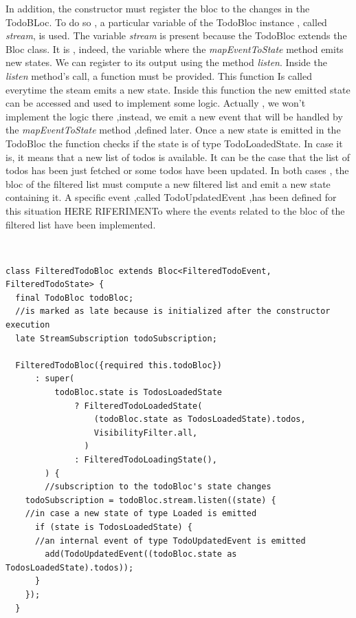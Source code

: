 In addition, the constructor must register the bloc to the changes in the TodoBLoc. To do so , a particular variable of the TodoBloc instance , called \textit{stream}, is used. The variable \textit{stream} is present because the TodoBloc extends the Bloc class. It is , indeed, the variable where the \textit{mapEventToState} method emits new states. We can register to its output using the method \textit{listen}. Inside the \textit{listen} method’s call, a function must be provided. This function Is called everytime the steam emits a new state. Inside this function the new emitted state can be accessed and used to implement some logic. Actually , we won’t implement the logic there ,instead, we emit a new event that will be handled by the \textit{mapEventToState} method ,defined later. Once a new state is emitted in the TodoBloc the function checks if the state is of type TodoLoadedState. In case it is, it means that a new list of todos is available. It can be the case that the list of todos has been just fetched or some todos have been updated. In both cases , the bloc of the filtered list must compute a new filtered list and emit a new state containing it. A specific event ,called TodoUpdatedEvent ,has been defined for this situation HERE RIFERIMENTo where the events related to the bloc of the filtered list have been implemented.
\begin{code}
\mbox{}\\
 \mbox{}
\label{code:2.14}
\begin{verbatim}
class FilteredTodoBloc extends Bloc<FilteredTodoEvent, FilteredTodoState> {
  final TodoBloc todoBloc;
  //is marked as late because is initialized after the constructor execution
  late StreamSubscription todoSubscription;

  FilteredTodoBloc({required this.todoBloc})
      : super(
          todoBloc.state is TodosLoadedState
              ? FilteredTodoLoadedState(
                  (todoBloc.state as TodosLoadedState).todos,
                  VisibilityFilter.all,
                )
              : FilteredTodoLoadingState(),
        ) {
        //subscription to the todoBloc's state changes
    todoSubscription = todoBloc.stream.listen((state) {
    //in case a new state of type Loaded is emitted
      if (state is TodosLoadedState) {
      //an internal event of type TodoUpdatedEvent is emitted
        add(TodoUpdatedEvent((todoBloc.state as TodosLoadedState).todos));
      }
    });
  }
\end{verbatim}
\mbox{}
\end{code}

